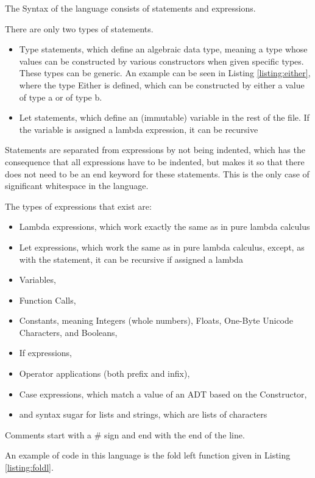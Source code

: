 \documentclass[12pt]{article}
\begin{document}
The Syntax of the language consists of statements and expressions.

There are only two types of statements.
\begin{itemize}
	\item Type statements, which define an algebraic data type,
	      meaning a type whose values can be constructed by various
	      constructors when given specific types.
	      These types can be generic.
	      An example can be seen in Listing \ref{listing:either}, where the type Either is defined,
	      which can be constructed by either a value of type a or of type b.
	\item Let statements, which define an (immutable) variable
	      in the rest of the file. If the variable is assigned a
	      lambda expression, it can be recursive
\end{itemize}
Statements are separated from expressions by not being indented,
which has the consequence that all expressions have to be indented,
but makes it so that there does not need to be an end keyword
for these statements.
This is the only case of significant whitespace in the language.

The types of expressions that exist are:
\begin{itemize}
	\item Lambda expressions, which work exactly
	      the same as in pure lambda calculus
	\item Let expressions, which work the same as in pure
	      lambda calculus, except, as with the statement,
	      it can be recursive if assigned a lambda
	\item Variables,
	\item Function Calls,
	\item Constants, meaning Integers (whole numbers), Floats,
	      One-Byte Unicode Characters, and Booleans,
	\item If expressions,
	\item Operator applications (both prefix and infix),
	\item Case expressions, which match a value of an ADT
	      based on the Constructor,
	\item and syntax sugar for lists and strings,
	      which are lists of characters
\end{itemize}

Comments start with a $\#$ sign and end with the end of the line.

An example of code in this language is the fold left function
given in Listing \ref{listing:foldl}.
\end{document}
